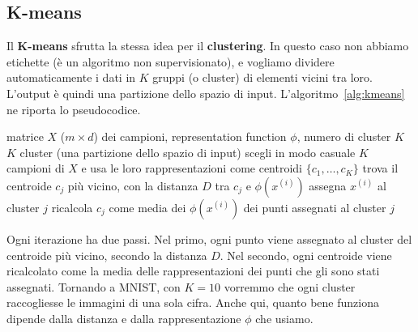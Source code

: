 \subsection{K-means}
Il \textbf{K-means} sfrutta la stessa idea per il \textbf{clustering}. In questo caso non abbiamo etichette (è un algoritmo non supervisionato), e vogliamo dividere automaticamente i dati in $K$ gruppi (o cluster) di elementi vicini tra loro. L'output è quindi una partizione dello spazio di input. L'algoritmo~\ref{alg:kmeans} ne riporta lo pseudocodice.

\begin{algorithm}[htbp]
\caption{Clustering K-means}\label{alg:kmeans}
\begin{algorithmic}[1]
\Require matrice $X$ ($m \times d$) dei campioni, representation function $\phi$, numero di cluster $K$
\Ensure $K$ cluster (una partizione dello spazio di input)
\State scegli in modo casuale $K$ campioni di $X$ e usa le loro rappresentazioni come centroidi $\{c_1, \dots, c_K\}$
\Repeat
        \State trova il centroide $c_j$ più vicino, con la distanza $D$ tra $c_j$ e $\phi(x^{(i)})$
        \State assegna $x^{(i)}$ al cluster $j$
    \EndFor
        \State ricalcola $c_j$ come media dei $\phi(x^{(i)})$ dei punti assegnati al cluster $j$
    \EndFor
{}
\end{algorithmic}
\end{algorithm}

Ogni iterazione ha due passi. Nel primo, ogni punto viene assegnato al cluster del centroide più vicino, secondo la distanza $D$. Nel secondo, ogni centroide viene ricalcolato come la media delle rappresentazioni dei punti che gli sono stati assegnati. Tornando a MNIST, con $K = 10$ vorremmo che ogni cluster raccogliesse le immagini di una sola cifra. Anche qui, quanto bene funziona dipende dalla distanza e dalla rappresentazione $\phi$ che usiamo.

